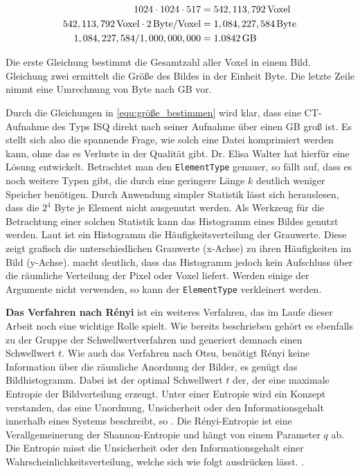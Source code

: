 \begin{align}
	\label{equ:größe_bestimmen}1024 \cdot 1024 \cdot 517    & = 542,113,792 \, \text{Voxel}\notag  \\
	542,113,792 \, \text{Voxel}\cdot 2 \, \text{Byte/Voxel} & = 1,084,227,584 \, \text{Byte}\notag \\
	1,084,227,584 / 1,000,000,000                           & = 1.0842 \, \text{GB}
\end{align}

Die erste Gleichung bestimmt die Gesamtzahl aller Voxel in einem Bild. Gleichung
zwei ermittelt die Größe des Bildes in der Einheit Byte. Die letzte Zeile nimmt
eine Umrechnung von Byte nach \ac{GB} vor.

Durch die Gleichungen in \ref{equ:größe_bestimmen} wird klar, dass eine \ac{CT}-Aufnahme
des Typs \ac{ISQ} direkt nach seiner Aufnahme über einen \ac{GB} groß ist. Es
stellt sich also die spannende Frage, wie solch eine Datei komprimiert werden kann,
ohne das es Verluste in der Qualität gibt. Dr. Elisa Walter hat hierfür eine
Lösung entwickelt. Betrachtet man den \texttt{ElementType} genauer, so fällt auf,
dass es noch weitere Typen gibt, die durch eine geringere Länge $k$ deutlich weniger
Speicher benötigen. Durch Anwendung simpler Statistik lässt sich herauslesen, dass
die $2^{4}$ Byte je Element nicht ausgenutzt werden. Als Werkzeug für die
Betrachtung einer solchen Statistik kann das Histogramm eines Bildes genutzt
werden. Laut \citet[S.~249]{jahne2024} ist ein Histogramm die
Häufigkeitsverteilung der Grauwerte. Diese zeigt grafisch die unterschiedlichen Grauwerte
(x-Achse) zu ihren Häufigkeiten im Bild (y-Achse). \citet[S.~249]{jahne2024} macht
deutlich, dass das Histogramm jedoch kein Aufschluss über die räumliche
Verteilung der Pixel oder Voxel liefert. Werden einige der Argumente nicht verwenden,
so kann der \texttt{ElementType} verkleinert werden.

\textbf{Das Verfahren nach Rényi} ist ein weiteres Verfahren, das im Laufe dieser
Arbeit noch eine wichtige Rolle spielt. Wie bereits beschrieben gehört es
ebenfalls zu der Gruppe der Schwellwertverfahren und generiert demnach einen
Schwellwert $t$. Wie auch das Verfahren nach Otsu, benötigt Rényi keine
Information über die räumliche Anordnung der Bilder, es genügt das Bildhistogramm.
Dabei ist der optimal Schwellwert $t$ der, der eine maximale Entropie der Bildverteilung
erzeugt. Unter einer Entropie wird ein Konzept verstanden, das eine Unordnung,
Unsicherheit oder den Informationsgehalt innerhalb eines Systems beschreibt, so \citet[S.~102]{bein2006}.
Die Rényi-Entropie ist eine Verallgemeinerung der Shannon-Entropie und hängt von
einem Parameter $q$ ab. Die Entropie misst die Unsicherheit oder den
Informationsgehalt einer Wahrscheinlichkeitsverteilung, welche sich wie folgt ausdrücken
lässt. \citep[vgl.][K.~2]{bromiley2004}.

